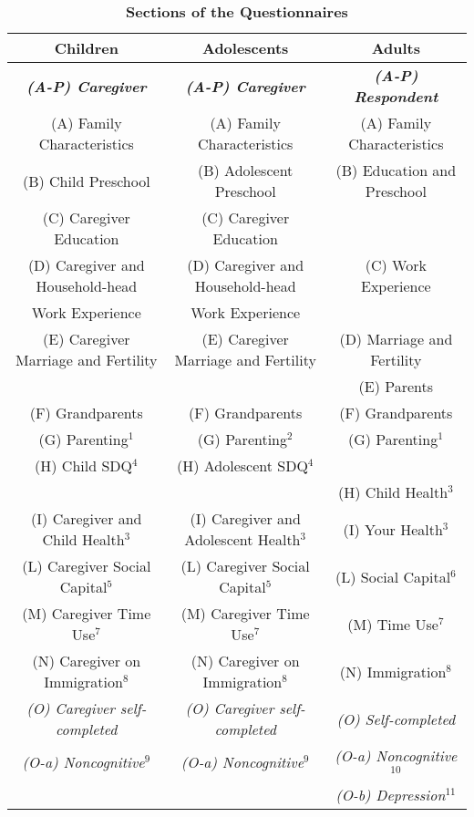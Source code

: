 \begin{table}
\caption{\textbf{Sections of the Questionnaires}}
\scriptsize
\label{tab:SecQuest}
\begin{center}
\tiny
\begin{tabular}{ c c c }
\hline\hline
\textbf{Children} & \textbf{Adolescents} & \textbf{Adults}\\
\hline
\textbf{\textit{(A-P) Caregiver}} & \textbf{\textit{(A-P) Caregiver}} & \textbf{\textit{(A-P) Respondent}}\\
\hline
(A) Family Characteristics & (A) Family Characteristics & (A) Family Characteristics \\
(B) Child Preschool & (B) Adolescent Preschool & (B) Education and Preschool \\
(C) Caregiver Education & (C) Caregiver Education & \\
(D) Caregiver and Household-head & (D) Caregiver and Household-head & (C) Work Experience \\
     Work Experience & Work Experience & \\
(E) Caregiver Marriage and Fertility & (E) Caregiver Marriage and Fertility & (D) Marriage and Fertility \\
 &  & (E) Parents \\
(F) Grandparents & (F) Grandparents & (F) Grandparents \\
(G) Parenting$^{1}$ & (G) Parenting$^{2}$ & (G) Parenting$^{1}$ \\
(H) Child SDQ$^{4}$ & (H) Adolescent SDQ$^{4}$ &  \\
 &  & (H) Child Health$^{3}$ \\
(I) Caregiver and Child Health$^{3}$ & (I) Caregiver and Adolescent Health$^{3}$ & (I) Your Health$^{3}$ \\
(L) Caregiver Social Capital$^{5}$ & (L) Caregiver Social Capital$^{5}$ & (L) Social Capital$^{6}$ \\
(M) Caregiver Time Use$^{7}$ & (M) Caregiver Time Use$^{7}$ & (M) Time Use$^{7}$ \\
(N) Caregiver on Immigration$^{8}$ & (N) Caregiver on Immigration$^{8}$ & (N) Immigration$^{8}$ \\
\textit{(O) Caregiver self-completed} & \textit{(O) Caregiver self-completed} & \textit{(O) Self-completed} \\
\textit{(O-a) Noncognitive$^{9}$} & \textit{(O-a) Noncognitive$^{9}$} & \textit{(O-a) Noncognitive$^{10}$} \\
 &  & \textit{(O-b) Depression$^{11}$} \\

\end{tabular}
\end{center}
\end{table}
